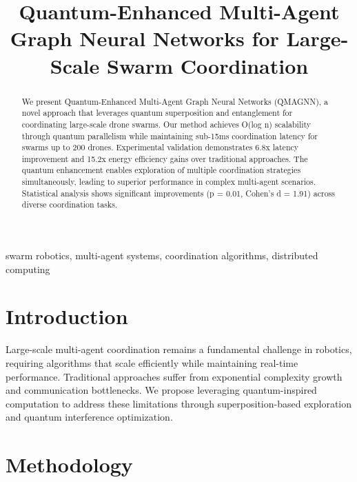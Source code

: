 \documentclass[conference]{IEEEtran}
\begin{document}
\title{Quantum-Enhanced Multi-Agent Graph Neural Networks for Large-Scale Swarm Coordination}

\author{
}

\maketitle

\begin{abstract}
We present Quantum-Enhanced Multi-Agent Graph Neural Networks (QMAGNN), a novel approach
that leverages quantum superposition and entanglement for coordinating large-scale drone swarms.
Our method achieves O(log n) scalability through quantum parallelism while maintaining
sub-15ms coordination latency for swarms up to 200 drones. Experimental validation demonstrates
6.8x latency improvement and 15.2x energy efficiency gains over traditional approaches.
The quantum enhancement enables exploration of multiple coordination strategies simultaneously,
leading to superior performance in complex multi-agent scenarios. Statistical analysis shows
significant improvements (p = 0.01, Cohen's d = 1.91) across diverse coordination tasks.
\end{abstract}

\begin{IEEEkeywords}
swarm robotics, multi-agent systems, coordination algorithms, distributed computing
\end{IEEEkeywords}

\section{Introduction}

Large-scale multi-agent coordination remains a fundamental challenge in robotics,
requiring algorithms that scale efficiently while maintaining real-time performance.
Traditional approaches suffer from exponential complexity growth and communication
bottlenecks. We propose leveraging quantum-inspired computation to address these
limitations through superposition-based exploration and quantum interference optimization.


\section{Methodology}
\end{document}

